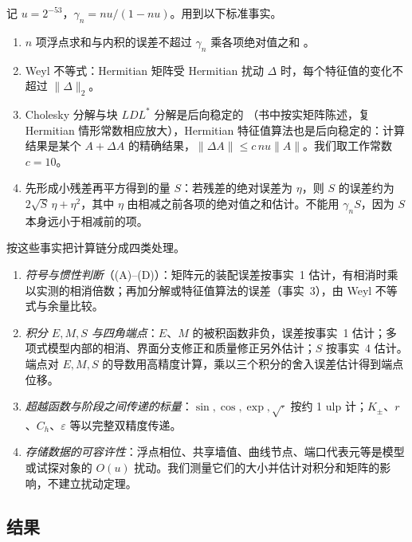 \documentclass[11pt,a4paper,fontset=fandol]{ctexart}
\theoremstyle{plain}
\theoremstyle{definition}
\theoremstyle{remark}
\begin{document}
记 $u=2^{-53}$，$\gamma_n=nu/(1-nu)$。用到以下标准事实。
\begin{enumerate}
\item $n$ 项浮点求和与内积的误差不超过 $\gamma_n$ 乘各项绝对值之和 \cite[引理~3.1、式~(3.5)、\S4.2]{Higham2002}。
\item Weyl 不等式：Hermitian 矩阵受 Hermitian 扰动 $\Delta$ 时，每个特征值的变化不超过 $\|\Delta\|_2$。
\item Cholesky 分解与块 $LDL^*$ 分解是后向稳定的 \cite[定理~10.3、定理~11.3]{Higham2002}（书中按实矩阵陈述，复 Hermitian 情形常数相应放大），Hermitian 特征值算法也是后向稳定的：计算结果是某个 $A+\Delta A$ 的精确结果，$\|\Delta A\|\le c\,nu\|A\|$。我们取工作常数 $c=10$。
\item 先形成小残差再平方得到的量 $S$：若残差的绝对误差为 $\eta$，则 $S$ 的误差约为 $2\sqrt S\,\eta+\eta^2$，其中 $\eta$ 由相减之前各项的绝对值之和估计。不能用 $\gamma_nS$，因为 $S$ 本身远小于相减前的项。
\end{enumerate}
按这些事实把计算链分成四类处理。
\begin{enumerate}
\item \emph{符号与惯性判断}（(A)--(D)）：矩阵元的装配误差按事实~1 估计，有相消时乘以实测的相消倍数；再加分解或特征值算法的误差（事实~3），由 Weyl 不等式与余量比较。
\item \emph{积分 $E,M,S$ 与四角端点}：$E$、$M$ 的被积函数非负，误差按事实~1 估计；多项式模型内部的相消、界面分支修正和质量修正另外估计；$S$ 按事实~4 估计。端点对 $E,M,S$ 的导数用高精度计算，乘以三个积分的舍入误差估计得到端点位移。
\item \emph{超越函数与阶段之间传递的标量}：$\sin,\cos,\exp,\sqrt{\cdot}$ 按约 1 ulp 计；$K_\pm$、$r$、$C_h$、$\varepsilon$ 等以完整双精度传递。
\item \emph{存储数据的可容许性}：浮点相位、共享墙值、曲线节点、端口代表元等是模型或试探对象的 $O(u)$ 扰动。我们测量它们的大小并估计对积分和矩阵的影响，不建立扰动定理。
\end{enumerate}

\subsection{结果}
\end{document}
